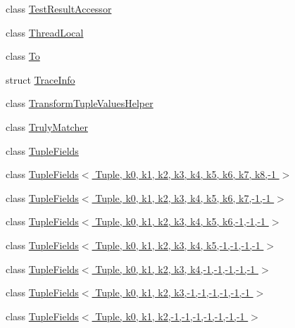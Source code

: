 \begin{DoxyCompactItemize}
\item 
class \hyperlink{classtesting_1_1internal_1_1TestResultAccessor}{Test\+Result\+Accessor}
\item 
class \hyperlink{classtesting_1_1internal_1_1ThreadLocal}{Thread\+Local}
\item 
class \hyperlink{classtesting_1_1internal_1_1To}{To}
\item 
struct \hyperlink{structtesting_1_1internal_1_1TraceInfo}{Trace\+Info}
\item 
class \hyperlink{classtesting_1_1internal_1_1TransformTupleValuesHelper}{Transform\+Tuple\+Values\+Helper}
\item 
class \hyperlink{classtesting_1_1internal_1_1TrulyMatcher}{Truly\+Matcher}
\item 
class \hyperlink{classtesting_1_1internal_1_1TupleFields}{Tuple\+Fields}
\item 
class \hyperlink{classtesting_1_1internal_1_1TupleFields_3_01Tuple_00_01k0_00_01k1_00_01k2_00_01k3_00_01k4_00_01k7d05709aed2fdf4fd2f884d75b9bd5cd}{Tuple\+Fields$<$ Tuple, k0, k1, k2, k3, k4, k5, k6, k7, k8,-\/1 $>$}
\item 
class \hyperlink{classtesting_1_1internal_1_1TupleFields_3_01Tuple_00_01k0_00_01k1_00_01k2_00_01k3_00_01k4_00_01k58e55129982dcbf796bc09f321e253b2}{Tuple\+Fields$<$ Tuple, k0, k1, k2, k3, k4, k5, k6, k7,-\/1,-\/1 $>$}
\item 
class \hyperlink{classtesting_1_1internal_1_1TupleFields_3_01Tuple_00_01k0_00_01k1_00_01k2_00_01k3_00_01k4_00_01k5_00_01k6_00-1_00-1_00-1_01_4}{Tuple\+Fields$<$ Tuple, k0, k1, k2, k3, k4, k5, k6,-\/1,-\/1,-\/1 $>$}
\item 
class \hyperlink{classtesting_1_1internal_1_1TupleFields_3_01Tuple_00_01k0_00_01k1_00_01k2_00_01k3_00_01k4_00_01k5_00-1_00-1_00-1_00-1_01_4}{Tuple\+Fields$<$ Tuple, k0, k1, k2, k3, k4, k5,-\/1,-\/1,-\/1,-\/1 $>$}
\item 
class \hyperlink{classtesting_1_1internal_1_1TupleFields_3_01Tuple_00_01k0_00_01k1_00_01k2_00_01k3_00_01k4_00-1_00-1_00-1_00-1_00-1_01_4}{Tuple\+Fields$<$ Tuple, k0, k1, k2, k3, k4,-\/1,-\/1,-\/1,-\/1,-\/1 $>$}
\item 
class \hyperlink{classtesting_1_1internal_1_1TupleFields_3_01Tuple_00_01k0_00_01k1_00_01k2_00_01k3_00-1_00-1_00-1_00-1_00-1_00-1_01_4}{Tuple\+Fields$<$ Tuple, k0, k1, k2, k3,-\/1,-\/1,-\/1,-\/1,-\/1,-\/1 $>$}
\item 
class \hyperlink{classtesting_1_1internal_1_1TupleFields_3_01Tuple_00_01k0_00_01k1_00_01k2_00-1_00-1_00-1_00-1_00-1_00-1_00-1_01_4}{Tuple\+Fields$<$ Tuple, k0, k1, k2,-\/1,-\/1,-\/1,-\/1,-\/1,-\/1,-\/1 $>$}

\end{DoxyCompactItemize}
